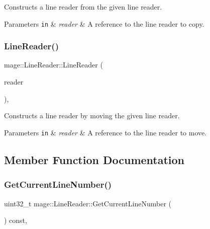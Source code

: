 Constructs a line reader from the given line reader.


\begin{DoxyParams}[1]{Parameters}
\mbox{\tt in}  & {\em reader} & A reference to the line reader to copy. \\
\hline
\end{DoxyParams}
\hypertarget{classmage_1_1_line_reader_ad972c7100f726e7b061d864083ba0225}{}\label{classmage_1_1_line_reader_ad972c7100f726e7b061d864083ba0225} 
\subsubsection{\texorpdfstring{Line\+Reader()}{LineReader()}\hspace{0.1cm}{\footnotesize\ttfamily [3/3]}}
{\footnotesize\ttfamily mage\+::\+Line\+Reader\+::\+Line\+Reader (\begin{DoxyParamCaption}\item[{\hyperlink{classmage_1_1_line_reader}{Line\+Reader} \&\&}]{reader }\end{DoxyParamCaption})\hspace{0.3cm}{\ttfamily [protected]}, {\ttfamily [default]}}

Constructs a line reader by moving the given line reader.


\begin{DoxyParams}[1]{Parameters}
\mbox{\tt in}  & {\em reader} & A reference to the line reader to move. \\
\hline
\end{DoxyParams}


\subsection{Member Function Documentation}
\hypertarget{classmage_1_1_line_reader_a330af09d4f1b9af3c12f98dc04ac7209}{}\label{classmage_1_1_line_reader_a330af09d4f1b9af3c12f98dc04ac7209} 
\subsubsection{\texorpdfstring{Get\+Current\+Line\+Number()}{GetCurrentLineNumber()}}
{\footnotesize\ttfamily uint32\+\_\+t mage\+::\+Line\+Reader\+::\+Get\+Current\+Line\+Number (\begin{DoxyParamCaption}{ }\end{DoxyParamCaption}) const\hspace{0.3cm}{\ttfamily [protected]}, {\ttfamily [noexcept]}}

